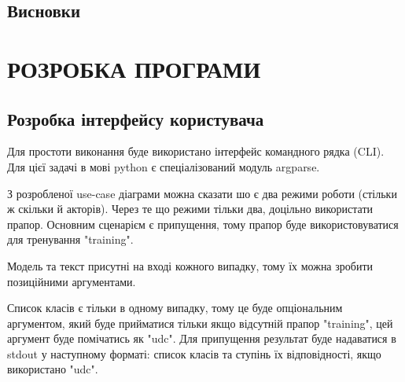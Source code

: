 \documentclass[14pt]{extarticle}
\let\oldsection\section
\renewcommand{\section}{\clearpage\oldsection}
\begin{document}
  \subsection{Висновки}

  \section{РОЗРОБКА ПРОГРАМИ}
  \subsection{Розробка інтерфейсу користувача}
  Для простоти виконання буде використано інтерфейс командного рядка (CLI). 
  Для цієї задачі в мові python є спеціалізований модуль argparse.

  З розробленої use-case діаграми можна сказати шо є два режими роботи
  (стільки  ж скільки й акторів).
  Через те що режими тільки два, доцільно використати прапор.
  Основним сценарієм є припущення,
  тому прапор буде використовуватися для тренування "\-\-training".
  
  Модель та текст присутні на вході кожного випадку,
  тому їх можна зробити позиційними аргументами.
  
  Список класів є тільки в одному випадку,
  тому це буде опціональним аргументом,
  який буде прийматися тільки якщо відсутній прапор "\-\-training",
  цей аргумент буде помічатись як "\-\-udc".
  Для припущення результат буде надаватися в stdout у наступному форматі:
  список класів та ступінь їх відповідності, якщо використано "\-\-udc".
  
\end{document}
